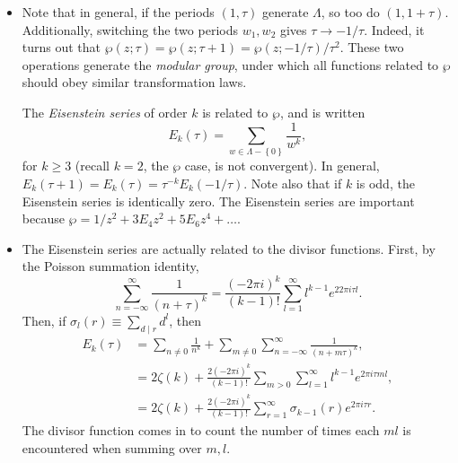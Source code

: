 \documentclass[11pt,
        usenames, %
        dvipsnames %
    ]{report}
\newcommand*{\p}[1]{\left(#1\right)}
\newcommand*{\z}[1]{\left\{#1\right\}}
\begin{document}
\begin{itemize}
    \item Note that in general, if the periods $(1, \tau)$ generate $\Lambda$,
        so too do $(1, 1 + \tau)$. Additionally, switching the two periods $w_1,
        w_2$ gives $\tau \to -1/\tau$. Indeed, it turns out that $\wp(z; \tau) =
        \wp\p{z; \tau + 1} = \wp\p{z; -1/\tau} / \tau^2$. These two operations
        generate the \emph{modular group}, under which all functions related to
        $\wp$ should obey similar transformation laws.

        The \emph{Eisenstein series} of order $k$ is related to $\wp$, and is
        written
        \begin{equation}
            E_k(\tau) = \sum\limits_{w \in \Lambda - \z{0}} \frac{1}{w^k},
        \end{equation}
        for $k \geq 3$ (recall $k = 2$, the $\wp$ case, is not convergent). In
        general, $E_k(\tau + 1) = E_k(\tau) = \tau^{-k} E_k\p{-1/\tau}$. Note
        also that if $k$ is odd, the Eisenstein series is identically zero. The
        Eisenstein series are important because $\wp = 1/z^2 + 3E_4z^2 + 5E_6z^4
        + \dots$.

    \item The Eisenstein series are actually related to the divisor functions.
        First, by the Poisson summation identity,
        \begin{equation}
            \sum\limits_{n = -\infty}^\infty \frac{1}{\p{n + \tau}^k}
                = \frac{\p{-2\pi i}^k}{(k - 1)!} \sum\limits_{l = 1}^\infty
                    l^{k - 1}e^{22\pi i \tau l}.
        \end{equation}
        Then, if $\sigma_l(r) \equiv \sum\limits_{d \mid r}d^l$, then
        \begin{align}
            E_k(\tau) &= \sum\limits_{n \neq 0}\frac{1}{n^k}
                + \sum\limits_{m \neq 0}\sum\limits_{n = -\infty}^\infty
                    \frac{1}{(n + m\tau)^k},\\
                &= 2\zeta(k) + \frac{2(-2\pi i)^k}{(k - 1)!}
                    \sum\limits_{m > 0}\sum\limits_{l = 1}^\infty l^{k - 1}
                        e^{2\pi i \tau ml},\\
                &= 2\zeta(k) + \frac{2(-2\pi i)^k}{(k - 1)!}
                    \sum\limits_{r = 1}^\infty \sigma_{k - 1}(r) e^{2\pi i \tau
                    r}.
        \end{align}
        The divisor function comes in to count the number of times each $ml$ is
        encountered when summing over $m, l$.


\end{itemize}
\end{document}
